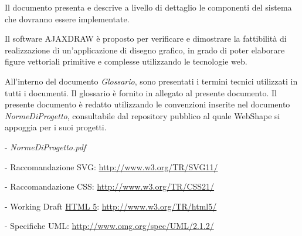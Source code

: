 \newpage
\thispagestyle{fancy}
\tableofcontents
\thispagestyle{fancy}
\newpage



Il documento presenta e descrive a livello di dettaglio le componenti del sistema che dovranno essere implementate.

Il software AJAXDRAW \`e proposto per verificare e dimostrare la fattibilit\`a di realizzazione di un'applicazione di disegno grafico, in grado di poter elaborare figure vettoriali primitive e complesse utilizzando le tecnologie web.

All'interno del documento \textit{Glossario}, sono presentati i termini tecnici utilizzati in tutti i documenti. Il glossario \`e fornito in allegato al presente documento.
Il presente documento \`e redatto utilizzando le convenzioni inserite nel documento \textit{NormeDiProgetto}, consultabile dal repository pubblico al quale WebShape si appoggia per i suoi progetti.
\begin{elencopuntato}[\subsubsecindent]
\item[-] \textit{NormeDiProgetto.pdf}
\item[-] Raccomandazione SVG: \href{http://www.w3.org/TR/SVG11/}{http://www.w3.org/TR/SVG11/}
\item[-] Raccomandazione CSS: \href{http://www.w3.org/TR/CSS21/}{http://www.w3.org/TR/CSS21/}
\item[-] Working Draft \underline{HTML 5}: \href{http://www.w3.org/TR/html5/}{http://www.w3.org/TR/html5/}
\item[-] Specifiche UML: \href{http://www.omg.org/spec/UML/2.1.2/}{http://www.omg.org/spec/UML/2.1.2/}
\end{elencopuntato}

